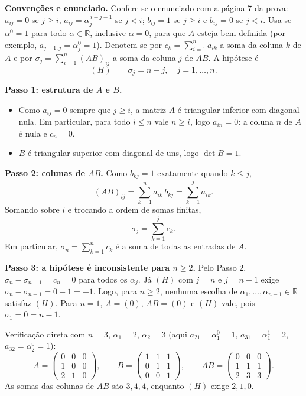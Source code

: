 \documentclass{article}%
\begin{document}
\textbf{Convenções e enunciado.} Confere-se o enunciado com a página 7 da prova: $a_{ij}=0$ se $j\ge i$, $a_{ij}=\alpha_j^{\,i-j-1}$ se $j<i$; $b_{ij}=1$ se $j\ge i$ e $b_{ij}=0$ se $j<i$. Usa-se $\alpha^{0}=1$ para todo $\alpha\in\mathbb{R}$, inclusive $\alpha=0$, para que $A$ esteja bem definida (por exemplo, $a_{j+1,j}=\alpha_j^{0}=1$). Denotem-se por $c_k=\sum_{i=1}^{n}a_{ik}$ a soma da coluna $k$ de $A$ e por $\sigma_j=\sum_{i=1}^{n}(AB)_{ij}$ a soma da coluna $j$ de $AB$. A hipótese é
\[
(H)\qquad \sigma_j=n-j,\quad j=1,\dots,n.
\]

\textbf{Passo 1: estrutura de $A$ e $B$.}
\begin{itemize}
\item Como $a_{ij}=0$ sempre que $j\ge i$, a matriz $A$ é triangular inferior com diagonal nula. Em particular, para todo $i\le n$ vale $n\ge i$, logo $a_{in}=0$: a coluna $n$ de $A$ é nula e $c_n=0$.
\item $B$ é triangular superior com diagonal de uns, logo $\det B=1$.
\end{itemize}

\textbf{Passo 2: colunas de $AB$.} Como $b_{kj}=1$ exatamente quando $k\le j$,
\[
(AB)_{ij}=\sum_{k=1}^{n}a_{ik}\,b_{kj}=\sum_{k=1}^{j}a_{ik}.
\]
Somando sobre $i$ e trocando a ordem de somas finitas,
\[
\sigma_j=\sum_{k=1}^{j}c_k .
\]
Em particular, $\sigma_n=\sum_{k=1}^{n}c_k$ é a soma de todas as entradas de $A$.

\textbf{Passo 3: a hipótese é inconsistente para $n\ge 2$.} Pelo Passo 2, $\sigma_n-\sigma_{n-1}=c_n=0$ para todos os $\alpha_j$. Já $(H)$ com $j=n$ e $j=n-1$ exige $\sigma_n-\sigma_{n-1}=0-1=-1$. Logo, para $n\ge 2$, nenhuma escolha de $\alpha_1,\dots,\alpha_{n-1}\in\mathbb{R}$ satisfaz $(H)$. Para $n=1$, $A=(0)$, $AB=(0)$ e $(H)$ vale, pois $\sigma_1=0=n-1$.

Verificação direta com $n=3$, $\alpha_1=2$, $\alpha_2=3$ (aqui $a_{21}=\alpha_1^{0}=1$, $a_{31}=\alpha_1^{1}=2$, $a_{32}=\alpha_2^{0}=1$):
\[
A=\begin{pmatrix}0&0&0\\1&0&0\\2&1&0\end{pmatrix},\qquad
B=\begin{pmatrix}1&1&1\\0&1&1\\0&0&1\end{pmatrix},\qquad
AB=\begin{pmatrix}0&0&0\\1&1&1\\2&3&3\end{pmatrix}.
\]
As somas das colunas de $AB$ são $3,4,4$, enquanto $(H)$ exige $2,1,0$.
\end{document}
